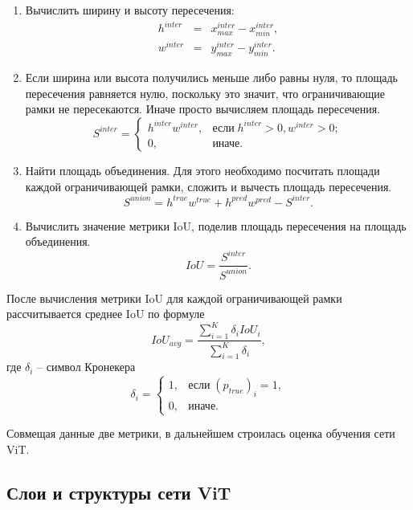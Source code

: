 \documentclass[14pt,a4paper]{extarticle}
\begin{document}
\begin{itemize}
\begin{enumerate}
\item Вычислить ширину и высоту пересечения:
\begin{eqnarray}
h^{inter} & = & x_{max}^{inter} - x_{min}^{inter} ,\\
w^{inter} & = & y_{max}^{inter} - y_{min}^{inter}.
\end{eqnarray}
\item Если ширина или высота получились меньше либо равны нуля, то площадь пересечения равняется нулю, поскольку это значит, что ограничивающие рамки не пересекаются. Иначе просто вычисляем площадь пересечения.
\begin{equation}
S^{inter} = \left\{
\begin{array}{ll}
h^{inter} w^{inter}, & \text{если} \; h^{inter} > 0, w^{inter} > 0;\\
0, & \text{иначе}.
\end{array}
\right. 
\end{equation}
\item Найти площадь объединения. Для этого необходимо посчитать площади каждой ограничивающей рамки, сложить и вычесть площадь пересечения.
\begin{equation}
S^{union} =
h^{true} w^{true} + h^{pred} w^{pred} - S^{inter}.
\end{equation}
\item Вычислить значение метрики IoU, поделив площадь пересечения на площадь объединения.
\begin{equation}
IoU = \dfrac{S^{inter}}{S^{union}}.
\end{equation}
\end{enumerate}

После вычисления метрики IoU для каждой ограничивающей рамки рассчитывается среднее IoU по формуле
\begin{equation}
IoU_{avg} = \dfrac{\sum_{i=1}^K \delta_i IoU_i}{\sum_{i=1}^K \delta_i },
\end{equation}
где $\delta_i$ -- символ Кронекера
\begin{equation}
\delta_i = \left\{
\begin{array}{ll}
1, & \text{если} \; (p_{true})_i = 1,\\
0, & \text{иначе}.
\end{array}
\right.
\end{equation}
\end{itemize}
Совмещая данные две метрики, в дальнейшем строилась оценка обучения сети ViT.

\newpage
\subsection{Слои и структуры сети ViT}
\end{document}
